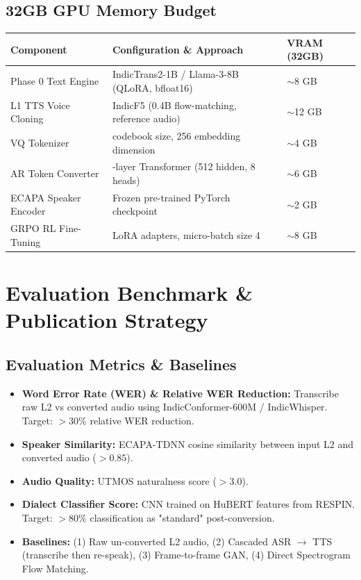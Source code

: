 \documentclass[11pt]{article}
\begin{document}
\subsection{32GB GPU Memory Budget}
\begin{table}[h!]
\centering
\small
\begin{tabular}{>{\raggedright\arraybackslash}p{4.2cm}>{\raggedright\arraybackslash}p{6.2cm}>{\raggedright\arraybackslash}p{2.2cm}}
\toprule
\textbf{Component} & \textbf{Configuration \& Approach} & \textbf{VRAM (32GB)} \\
\midrule
Phase 0 Text Engine & IndicTrans2-1B / Llama-3-8B (QLoRA, bfloat16) & $\sim$8 GB \\
L1 TTS Voice Cloning & IndicF5 (0.4B flow-matching, reference audio) & $\sim$12 GB \\
VQ Tokenizer & 512 codebook size, 256 embedding dimension & $\sim$4 GB \\
AR Token Converter & 6-layer Transformer (512 hidden, 8 heads) & $\sim$6 GB \\
ECAPA Speaker Encoder & Frozen pre-trained PyTorch checkpoint & $\sim$2 GB \\
GRPO RL Fine-Tuning & LoRA adapters, micro-batch size 4 & $\sim$8 GB \\
\bottomrule
\end{tabular}
\end{table}

\section{Evaluation Benchmark \& Publication Strategy}

\subsection{Evaluation Metrics \& Baselines}
\begin{itemize}[leftmargin=*]
  \item \textbf{Word Error Rate (WER) \& Relative WER Reduction:} Transcribe raw L2 vs converted audio using IndicConformer-600M / IndicWhisper. Target: $>30\%$ relative WER reduction.
  \item \textbf{Speaker Similarity:} ECAPA-TDNN cosine similarity between input L2 and converted audio ($>0.85$).
  \item \textbf{Audio Quality:} UTMOS naturalness score ($>3.0$).
  \item \textbf{Dialect Classifier Score:} CNN trained on HuBERT features from RESPIN. Target: $>80\%$ classification as "standard" post-conversion.
  \item \textbf{Baselines:} (1) Raw un-converted L2 audio, (2) Cascaded ASR $\to$ TTS (transcribe then re-speak), (3) Frame-to-frame GAN, (4) Direct Spectrogram Flow Matching.
\end{itemize}
\end{document}
